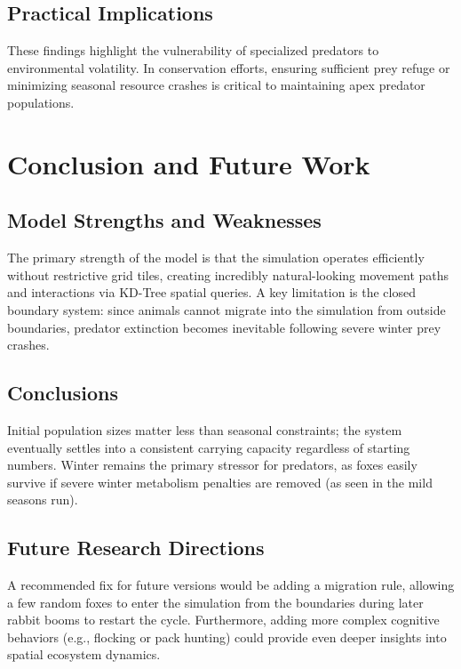 \documentclass[12pt]{article}
\begin{document}
\subsection{Practical Implications}
These findings highlight the vulnerability of specialized predators to environmental volatility. In conservation efforts, ensuring sufficient prey refuge or minimizing seasonal resource crashes is critical to maintaining apex predator populations.

\section{Conclusion and Future Work}

\subsection{Model Strengths and Weaknesses}
The primary strength of the model is that the simulation operates efficiently without restrictive grid tiles, creating incredibly natural-looking movement paths and interactions via KD-Tree spatial queries. A key limitation is the closed boundary system: since animals cannot migrate into the simulation from outside boundaries, predator extinction becomes inevitable following severe winter prey crashes.

\subsection{Conclusions}
Initial population sizes matter less than seasonal constraints; the system eventually settles into a consistent carrying capacity regardless of starting numbers. Winter remains the primary stressor for predators, as foxes easily survive if severe winter metabolism penalties are removed (as seen in the mild seasons run).

\subsection{Future Research Directions}
A recommended fix for future versions would be adding a migration rule, allowing a few random foxes to enter the simulation from the boundaries during later rabbit booms to restart the cycle. Furthermore, adding more complex cognitive behaviors (e.g., flocking or pack hunting) could provide even deeper insights into spatial ecosystem dynamics.
\end{document}
